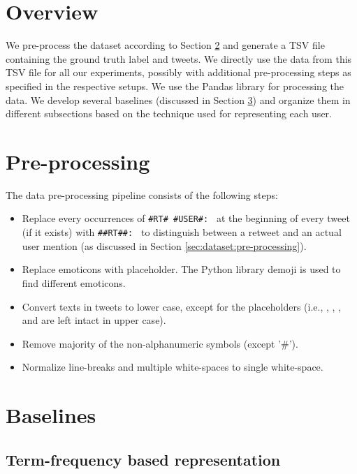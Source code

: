 \section{Overview}
\label{sec:models:overview}
We pre-process the dataset according to Section \ref{sec:models:pre-processing} and generate a TSV file containing the ground truth label and tweets. We directly use the data from this TSV file for all our experiments, possibly with additional pre-processing steps as specified in the respective setups. We use the Pandas \cite{pandas} library for processing the data. We develop several baselines (discussed in Section \ref{sec:models:baselines}) and organize them in different subsections based on the technique used for representing each user.


\section{Pre-processing}
\label{sec:models:pre-processing}
The data pre-processing pipeline consists of the following steps:
\begin{itemize}
    \item Replace every occurrences of  \texttt{\#RT\# \#USER\#: } at the beginning of every tweet (if it exists) with \texttt{\#\#RT\#\#: } to distinguish between a retweet and an actual user mention (as discussed in Section \ref{sec:dataset:pre-processing}).
    \item Replace emoticons with \maskEmoji{} placeholder. The Python library demoji is used to find different emoticons.
    \item Convert texts in tweets to lower case, except for the placeholders (i.e., \maskHashtag{}, \maskUser{}, \maskUrl{}, \maskRt and \maskEmoji{} are left intact in upper case).
    \item Remove majority of the non-alphanumeric symbols (except '\#').
    \item Normalize line-breaks and multiple white-spaces to single white-space.
\end{itemize}

\section{Baselines}
\label{sec:models:baselines}

\subsection{Term-frequency based representation}
\label{sec:models:tf-idf}

